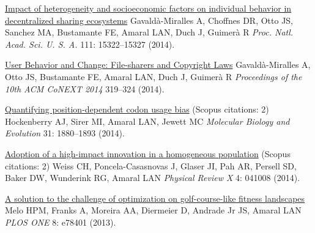 \NumberedItem{\makebox[0.8cm][r]{[106]}}
\href{/people/amaral/impact-heterogeneity-and-socioeconomic-factors-individual-behavior-decentralized-sharing-ecosystems}
{Impact of heterogeneity and socioeconomic factors on individual behavior in decentralized sharing ecosystems}
\newline
Gavald\`a-Miralles A, Choffnes DR, Otto JS, Sanchez MA, Bustamante FE, Amaral LAN, Duch J, Guimer\`a R
\newline
\textit{Proc. Natl. Acad. Sci. U. S. A.}
    111:
15322--15327 (2014).
\newline
\Gap
~
\Gap

\NumberedItem{\makebox[0.8cm][r]{[105]}}
\href{/people/amaral/user-behavior-and-change-file-sharers-and-copyright-laws}
{User Behavior and Change: File-sharers and Copyright Laws}
\newline
Gavald\`a-Miralles A, Otto JS, Bustamante FE, Amaral LAN, Duch J, Guimer\`a R
\newline
\textit{Proceedings of the 10th ACM CoNEXT 2014}
319--324 (2014).
\newline
\Gap
~
\Gap

\NumberedItem{\makebox[0.8cm][r]{[104]}}
\href{/people/amaral/quantifying-position-dependent-codon-usage-bias}
{Quantifying position-dependent codon usage bias}
    (Scopus citations: 2)
\newline
Hockenberry AJ, Sirer MI, Amaral LAN, Jewett MC
\newline
\textit{Molecular Biology and Evolution}
    31:
1880--1893 (2014).
\newline
\Gap
~
\Gap

\NumberedItem{\makebox[0.8cm][r]{[103]}}
\href{/people/amaral/adoption-high-impact-innovation-homogeneous-population}
{Adoption of a high-impact innovation in a homogeneous population}
    (Scopus citations: 2)
\newline
Weiss CH, Poncela-Casasnovas J, Glaser JI, Pah AR, Persell SD, Baker DW, Wunderink RG, Amaral LAN
\newline
\textit{Physical Review X}
    4:
041008 (2014).
\newline
\Gap
~
\Gap

\NumberedItem{\makebox[0.8cm][r]{[102]}}
\href{/people/amaral/solution_to_challenge}
{A solution to the challenge of optimization on golf-course-like fitness landscapes}
\newline
Melo HPM, Franks A, Moreira AA, Diermeier D, Andrade Jr JS, Amaral LAN
\newline
\textit{PLOS ONE}
    8:
e78401 (2013).
\newline
\Gap
~
\Gap

